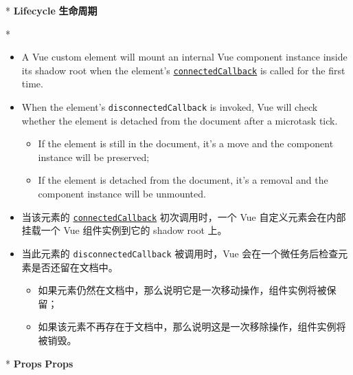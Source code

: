 \begin{paracol}{2} 
\switchcolumn[0]*
\textbf{Lifecycle}
\switchcolumn
\textbf{生命周期}
\end{paracol}

% 
\begin{paracol}{2}  

\switchcolumn[0]*%
\begin{itemize}
\item
  A Vue custom element will mount an internal Vue component instance
  inside its shadow root when the element's
  \href{https://developer.mozilla.org/en-US/docs/Web/Web_Components/Using_custom_elements\#using_the_lifecycle_callbacks}{\texttt{connectedCallback}}
  is called for the first time.
\item
  When the element's \texttt{disconnectedCallback} is invoked, Vue will
  check whether the element is detached from the document after a
  microtask tick.
  \begin{itemize}
  \item
    If the element is still in the document, it's a move and the
    component instance will be preserved;
  \item
    If the element is detached from the document, it's a removal and the
    component instance will be unmounted.
  \end{itemize}
\end{itemize}
\switchcolumn
\begin{itemize}
\item
  当该元素的
  \href{https://developer.mozilla.org/en-US/docs/Web/Web_Components/Using_custom_elements\#using_the_lifecycle_callbacks}{\texttt{connectedCallback}}
  初次调用时，一个 Vue 自定义元素会在内部挂载一个 Vue 组件实例到它的
  shadow root 上。
\item
  当此元素的 \texttt{disconnectedCallback} 被调用时，Vue
  会在一个微任务后检查元素是否还留在文档中。
  \begin{itemize}
  \item
    如果元素仍然在文档中，那么说明它是一次移动操作，组件实例将被保留；
  \item
    如果该元素不再存在于文档中，那么说明这是一次移除操作，组件实例将被销毁。
  \end{itemize}
\end{itemize}
\switchcolumn[0]*%
\textbf{Props}
\switchcolumn
\textbf{Props}
\end{paracol}



